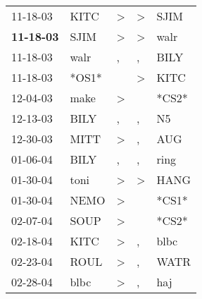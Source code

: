 \begin{supertabular}{p{0.07\textwidth}p{0.06\textwidth}p{0.02\textwidth}p{0.02\textwidth}p{0.06\textwidth}}
          11-18-03\textsuperscript{} &           KITC\textsuperscript{} &     \textgreater &     \textgreater &           SJIM\textsuperscript{} \\
 \textbf{11-18-03\textsuperscript{}} &           SJIM\textsuperscript{} &     \textgreater &     \textgreater &           walr\textsuperscript{} \\
          11-18-03\textsuperscript{} &           walr\textsuperscript{} &                , &                , &           BILY\textsuperscript{} \\
          11-18-03\textsuperscript{} &                            *OS1* &                  &     \textgreater &           KITC\textsuperscript{} \\
          12-04-03\textsuperscript{} &           make\textsuperscript{} &     \textgreater &                  &                            *CS2* \\
          12-13-03\textsuperscript{} &           BILY\textsuperscript{} &                , &                , &             N5\textsuperscript{} \\
          12-30-03\textsuperscript{} &           MITT\textsuperscript{} &     \textgreater &                , &            AUG\textsuperscript{} \\
          01-06-04\textsuperscript{} &           BILY\textsuperscript{} &                , &                , &           ring\textsuperscript{} \\
          01-30-04\textsuperscript{} &           toni\textsuperscript{} &     \textgreater &     \textgreater &           HANG\textsuperscript{} \\
          01-30-04\textsuperscript{} &           NEMO\textsuperscript{} &     \textgreater &                  &                            *CS1* \\
          02-07-04\textsuperscript{} &           SOUP\textsuperscript{} &     \textgreater &                  &                            *CS2* \\
          02-18-04\textsuperscript{} &           KITC\textsuperscript{} &     \textgreater &                , &           blbc\textsuperscript{} \\
          02-23-04\textsuperscript{} &           ROUL\textsuperscript{} &     \textgreater &                , &           WATR\textsuperscript{} \\
          02-28-04\textsuperscript{} &           blbc\textsuperscript{} &     \textgreater &                , &            haj\textsuperscript{} \\

\end{supertabular}
